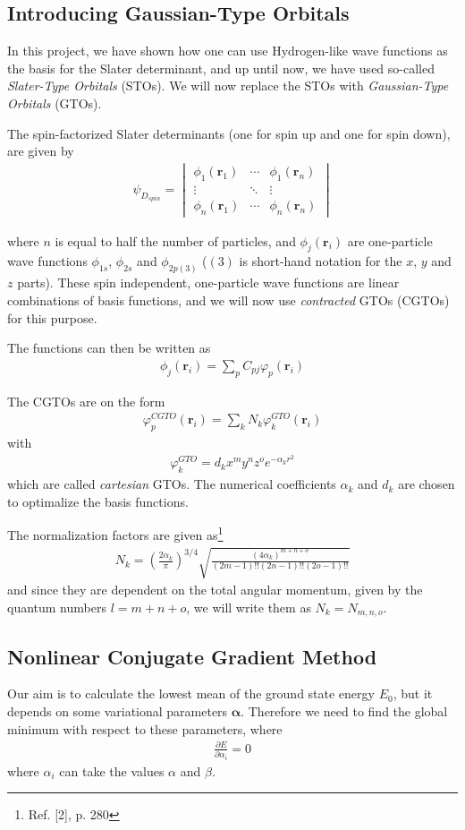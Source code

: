 \documentclass[twocolumns, a4paper,11pt,fleqn]{extarticle}
\newcommand{\eq}[1]{{\small\begin{align*}#1\end{align*}}}
\newcommand{\equ}[1]{{\small\begin{align}#1\end{align}}}
\newcommand{\vmat}[1]{\begin{vmatrix}#1\end{vmatrix}}
\renewcommand\vec[1]{\boldsymbol{\mathbf{#1}}}
\begin{document}
\subsection{Introducing Gaussian-Type Orbitals}
In this project, we have shown how one can use Hydrogen-like wave functions as the basis
for the Slater determinant, and up until now, 
we have used so-called \textit{Slater-Type Orbitals} (STOs).
We will now replace the STOs with \textit{Gaussian-Type Orbitals} (GTOs).

The spin-factorized Slater determinants (one for spin up and one for spin down),
are given by
\eq{\psi_{D_{spin}} = 
  \vmat{\phi_1(\vec r_1)& \cdots & \phi_1(\vec r_n)\\
  \vdots&\ddots&\vdots\\
  \phi_n(\vec r_1)& \cdots & \phi_n(\vec r_n)}
}

where $n$ is equal to half the number of particles, 
and  $\phi_j(\vec r_i)$ are one-particle wave functions 
$\phi_{1s}$, $\phi_{2s}$ and $\phi_{2p(3)}$
($(3)$ is short-hand notation for the $x$, $y$ and $z$ parts).
These spin independent, one-particle wave functions are
linear combinations of basis functions, and we will now use \textit{contracted} GTOs
(CGTOs) for this purpose.

The functions can then be written as
\equ{\phi_j(\vec r_i) = \sum_p C_{pj} \varphi_p(\vec r_i)\label{eq:gto}
}

The CGTOs are on the form
\eq{
  \varphi_p^{CGTO}(\vec r_i) = \sum_k N_k \varphi^{GTO}_k(\vec r_i)
}
with
\eq{
  \varphi^{GTO}_k = d_k x^m y^n z^o e^{-\alpha_k r^2}
}
which are called \textit{cartesian} GTOs. 
The numerical coefficients $\alpha_k$ and $d_k$ are chosen to optimalize the
basis functions.

The normalization factors are given as\footnote{Ref. [2], p. 280}
\eq{
  N_k = \left(\frac{2\alpha_k}{\pi}\right)^{3/4}
  \sqrt{\frac{(4\alpha_k)^{m+n+o}}{(2m-1)!!(2n-1)!!(2o-1)!!}}
}
and since they are dependent on the total angular momentum,
given by the quantum numbers $l = m+n+o$, we will write them as
$N_k = N_{m,n,o}$.

\subsection{Nonlinear Conjugate Gradient Method}
Our aim is to calculate the lowest mean of the ground state energy $E_0$,
but it depends on some variational parameters $\vec \alpha$.
Therefore we need to find the global minimum with respect to these parameters,
where
\eq{
  \frac{\partial E}{\partial \alpha_i} = 0
}
where $\alpha_i$ can take the values $\alpha$ and $\beta$.
\end{document}
